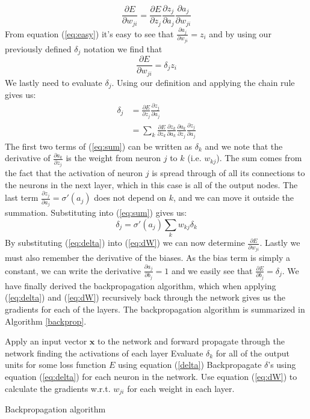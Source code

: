 \begin{equation}
\frac{\partial E}{\partial w_{ji}} = \frac{\partial E }{\partial
	z_j}\frac{\partial z_j}{\partial a_j} \frac{\partial a_j}{\partial w_{ji}}
\end{equation} 
From equation (\ref{eq:easy}) it's easy to see that $\frac{\partial
	a_j}{\partial w_{ji}} = z_i$ and by using our previously defined $\delta_j$
notation we find that
\begin{equation}
\label{eq:dW}
\frac{\partial E}{\partial w_{ji}} = \delta_j z_i
\end{equation}
We lastly need to evaluate $\delta_j$. Using our definition and applying the
chain rule gives us:
\begin{align}
\delta_j &= \frac{\partial E }{\partial z_j}\frac{\partial z_j}{\partial a_j} \\
\label{eq:sum}
&= \sum_k \frac{\partial E}{\partial z_k} \frac{\partial z_k}{\partial a_k}
\frac{\partial a_k}{\partial z_j} \frac{\partial z_j}{\partial a_j}
\end{align}
The first two terms of (\ref{eq:sum}) can be written as $\delta_k$ and we note
that the  derivative of $\frac{\partial a_k}{\partial z_j}$ is the weight from
neuron $j$ to $k$ (i.e. $w_{kj}$). The sum comes from the fact that the
activation of neuron $j$ is spread through of all its connections to the neurons
in the next layer, which in this case is all of the output nodes. The last term
$\frac{\partial z_j}{\partial a_j} = \sigma'(a_j)$ does not depend on $k$, and
we can move it outside the summation.  Substituting into (\ref{eq:sum}) gives
us:
\begin{equation}
\label{eq:delta}
\delta_j =   \sigma'(a_j) \sum_k w_{kj} \delta_k
\end{equation}
By substituting (\ref{eq:delta}) into (\ref{eq:dW}) we  can now determine
$\frac{\partial E}{\partial w_{ji}}$. Lastly we must also remember the
derivative of the biases. As the bias term is simply a constant, we can write
the derivative $\frac{\partial a_j}{\partial b_j} = 1$ and we easily see that
$\frac{\partial E}{\partial b_j} = \delta_j$. We have finally derived the
backpropagation algorithm, which when applying (\ref{eq:delta}) and
(\ref{eq:dW}) recursively back through the network gives us the gradients for
each of the layers. The backpropagation algorithm is summarized in Algorithm
\ref{backprop}.
\begin{algorithm}
	\begin{algorithmic}[1]
		\State Apply an input vector $\textbf{x}$ to the network and forward propagate
		through the network finding the activations of each layer
		\State Evaluate $\delta_k$ for all of the output units for some loss function
		$E$ using equation (\ref{delta})
		\State Backpropagate $\delta$'s using equation (\ref{eq:delta}) for each
		neuron in the network.
		\State Use equation (\ref{eq:dW}) to calculate the gradients w.r.t. $w_{ji}$
		for each weight in each layer. 
	\end{algorithmic}
	\caption{Backpropagation algorithm}\label{backprop}
\end{algorithm} \newline 
